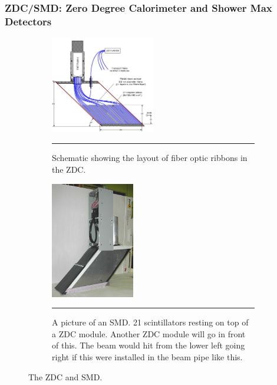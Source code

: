 \subsubsection{ZDC/SMD: Zero Degree Calorimeter and Shower Max Detectors}
\label{sect:ZDC}

\begin{figure}

\begin{subfigure}[p]{1\textwidth}
  \centering
    \includegraphics[width=0.5\textwidth]{Figures/ZDCschematic.JPG}

  \caption[Schematic showing a side view of the layout of fiber optics in the ZDC]{Schematic showing the layout of fiber optic ribbons in the ZDC.}
  \label{fig:zdcschem}
   \rule{35em}{0.7pt}
\end{subfigure}
\begin{subfigure}[p]{1\textwidth}
  \centering
    \includegraphics[width=0.4\textwidth]{Figures/SMDonZDC.jpg}

  \caption[Picture of the SMD.]{A picture of an SMD. 21 scintillators resting on top of a ZDC module. Another ZDC module will go in front of this. The beam would hit from the lower left going right if this were installed in the beam pipe like this.}
  \label{fig:smdonzdc}
   \rule{35em}{0.7pt}
\end{subfigure}
\caption{The ZDC and SMD.}
\end{figure}


